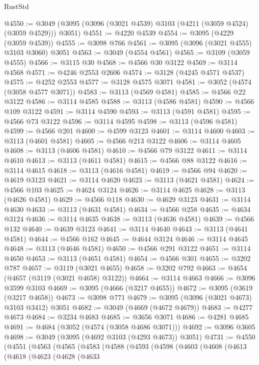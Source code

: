 \begin{lexlean}{RustStd}
\begin{coremodule}
{\begin{coremodule}
{{{{{{{{{{{{{{{{{{{{{{{{{{{{{{{{@4550 := @3049 (@3095 (@3096 (@3021 @4539) @3103 (@4211 (@3059 @4524) (@3059 @4529))) @3051)
@4551 := @4220 @4539
@4554 := @3095 (@4229 (@3059 @4539))
@4555 := @3098 @766
@4561 := @3095 (@3096 (@3021 @4555) @3103 @3060) @3051
@4563 := @3049 (@4554 @4561)
@4565 := @3109 (@3059 @4555)
@4566 := @3115 @30
@4568 := @4566 @30 @3122
@4569 := @3114 @4568
@4571 := @4246 @2553 @2606
@4574 := @3128 (@4245 @4571 @4537)
@4575 := @4252 @2553
@4577 := @3128 @4575 @3071
@4581 := @3052 (@4574 (@3058 @4577 @3071))
@4583 := @3113 (@4569 @4581)
@4585 := @4566 @22 @3122
@4586 := @3114 @4585
@4588 := @3113 (@4586 @4581)
@4590 := @4566 @109 @3122
@4591 := @3114 @4590
@4593 := @3113 (@4591 @4581)
@4595 := @4566 @73 @3122
@4596 := @3114 @4595
@4598 := @3113 (@4596 @4581)
@4599 := @4566 @201
@4600 := @4599 @3123
@4601 := @3114 @4600
@4603 := @3113 (@4601 @4581)
@4605 := @4566 @213 @3122
@4606 := @3114 @4605
@4608 := @3113 (@4606 @4581)
@4610 := @4566 @79 @3122
@4611 := @3114 @4610
@4613 := @3113 (@4611 @4581)
@4615 := @4566 @88 @3122
@4616 := @3114 @4615
@4618 := @3113 (@4616 @4581)
@4619 := @4566 @94
@4620 := @4619 @3123
@4621 := @3114 @4620
@4623 := @3113 (@4621 @4581)
@4624 := @4566 @103
@4625 := @4624 @3124
@4626 := @3114 @4625
@4628 := @3113 (@4626 @4581)
@4629 := @4566 @118
@4630 := @4629 @3123
@4631 := @3114 @4630
@4633 := @3113 (@4631 @4581)
@4634 := @4566 @258
@4635 := @4634 @3124
@4636 := @3114 @4635
@4638 := @3113 (@4636 @4581)
@4639 := @4566 @132
@4640 := @4639 @3123
@4641 := @3114 @4640
@4643 := @3113 (@4641 @4581)
@4644 := @4566 @162
@4645 := @4644 @3124
@4646 := @3114 @4645
@4648 := @3113 (@4646 @4581)
@4650 := @4566 @291 @3122
@4651 := @3114 @4650
@4653 := @3113 (@4651 @4581)
@4654 := @4566 @301
@4655 := @3202 @787
@4657 := @3119 (@3021 @4655)
@4658 := @3202 @792
@4663 := @4654 (@4657 (@3119 (@3021 @4658) @3122))
@4664 := @3114 @4663
@4666 := @3096 @3599 @3103
@4669 := @3095 (@4666 (@3217 @4655))
@4672 := @3095 (@3619 (@3217 @4658))
@4673 := @3098 @771
@4679 := @3095 (@3096 (@3021 @4673) @3103 @3412) @3051
@4682 := @3049 (@4669 (@4672 @4679))
@4683 := @4277 @4673
@4684 := @3234 @4683
@4685 := @3656 @3071
@4686 := @4281 @4685
@4691 := @4684 (@3052 (@4574 (@3058 @4686 @3071)))
@4692 := @3096 @3605
@4698 := @3049 (@3095 (@4692 @3103 (@4293 @4673)) @3051)
@4731 := @4550
    (@4551
      (@4563
        (@4565
          (@4583
            (@4588
              (@4593
                (@4598
                  (@4603
                    (@4608
                      (@4613
                        (@4618
                          (@4623
                            (@4628
                              (@4633
}}}}}}}}}}}}}}}}}}}}}}}}}}}}}}}}
\end{coremodule}}
\end{coremodule}
\end{lexlean}
